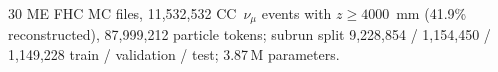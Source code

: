 30 ME FHC MC files, 11{,}532{,}532 CC~$\nu_\mu$ events with $z \ge 4000$~mm (41.9\% reconstructed), 87{,}999{,}212 particle tokens; subrun split 9{,}228{,}854 / 1{,}154{,}450 / 1{,}149{,}228 train / validation / test; 3.87\,M parameters.
